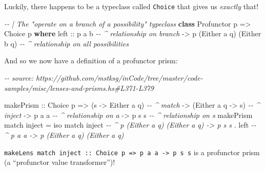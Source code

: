 \documentclass[]{article}
\newenvironment{Shaded}{}{}
\newcommand{\CommentTok}[1]{\textcolor[rgb]{0.38,0.63,0.69}{\textit{#1}}}
\newcommand{\DataTypeTok}[1]{\textcolor[rgb]{0.56,0.13,0.00}{#1}}
\newcommand{\KeywordTok}[1]{\textcolor[rgb]{0.00,0.44,0.13}{\textbf{#1}}}
\newcommand{\NormalTok}[1]{#1}
\newcommand{\OperatorTok}[1]{\textcolor[rgb]{0.40,0.40,0.40}{#1}}
\newcommand{\OtherTok}[1]{\textcolor[rgb]{0.00,0.44,0.13}{#1}}
\begin{document}
Luckily, there happens to be a typeclass called \texttt{Choice} that gives us
\emph{exactly} that!

\begin{Shaded}
\begin{Highlighting}[]
\CommentTok{{-}{-} | The "operate on a branch of a possibility" typeclass}
\KeywordTok{class} \DataTypeTok{Profunctor}\NormalTok{ p }\OtherTok{=\textgreater{}} \DataTypeTok{Choice}\NormalTok{ p }\KeywordTok{where}
\NormalTok{    left\textquotesingle{}}
\OtherTok{        ::}\NormalTok{ p a b                        }\CommentTok{{-}{-} \^{} relationship on branch}
        \OtherTok{{-}\textgreater{}}\NormalTok{ p (}\DataTypeTok{Either}\NormalTok{ a q) (}\DataTypeTok{Either}\NormalTok{ b q)  }\CommentTok{{-}{-} \^{} relationship on all possibilities}
\end{Highlighting}
\end{Shaded}

And so we now have a definition of a profunctor prism:

\begin{Shaded}
\begin{Highlighting}[]
\CommentTok{{-}{-} source: https://github.com/mstksg/inCode/tree/master/code{-}samples/misc/lenses{-}and{-}prisms.hs\#L371{-}L379}

\NormalTok{makePrism}
\OtherTok{    ::} \DataTypeTok{Choice}\NormalTok{ p}
    \OtherTok{=\textgreater{}}\NormalTok{ (s }\OtherTok{{-}\textgreater{}} \DataTypeTok{Either}\NormalTok{ a q)    }\CommentTok{{-}{-} \^{} match}
    \OtherTok{{-}\textgreater{}}\NormalTok{ (}\DataTypeTok{Either}\NormalTok{ a q }\OtherTok{{-}\textgreater{}}\NormalTok{ s)    }\CommentTok{{-}{-} \^{} inject}
    \OtherTok{{-}\textgreater{}}\NormalTok{ p a a                }\CommentTok{{-}{-} \^{} relationship on a}
    \OtherTok{{-}\textgreater{}}\NormalTok{ p s s                }\CommentTok{{-}{-} \^{} relationship on s}
\NormalTok{makePrism match inject }\OtherTok{=}
\NormalTok{    iso match inject   }\CommentTok{{-}{-} \^{} p (Either a q) (Either a q) {-}\textgreater{} p s s}
  \OperatorTok{.}\NormalTok{ left\textquotesingle{}              }\CommentTok{{-}{-} \^{} p a a {-}\textgreater{} p (Either a q) (Either a q)}
\end{Highlighting}
\end{Shaded}

\texttt{makeLens\ match\ inject\ ::\ Choice\ p\ =\textgreater{}\ p\ a\ a\ -\textgreater{}\ p\ s\ s}
is a profunctor prism (a ``profunctor value transformer'')!
\end{document}
